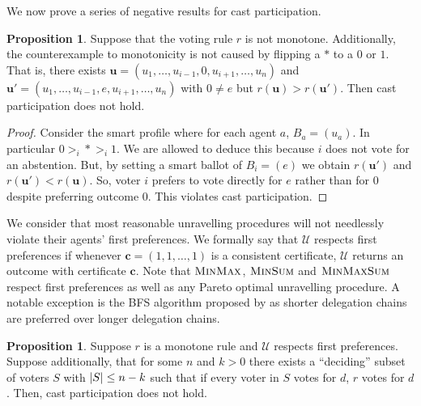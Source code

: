 \documentclass[11pt,a4paper, titlepage]{article}
\DeclarePairedDelimiter\abs{\lvert}{\rvert}
\theoremstyle{definition}
\newtheorem{proposition}[theorem]{Proposition}
\let\vec\mathbf
\begin{document}
We now prove a series of negative results for cast participation.



\begin{proposition} Suppose that the voting rule $r$ is not monotone. Additionally, the counterexample to monotonicity is not caused by flipping a $*$ to a $0$ or $1$. 
That is, there exists $\vec{u} = (u_1, \ldots, u_{i-1}, 0, u_{i+1}, \ldots, u_n)$ and $\vec{u}' = (u_1, \ldots, u_{i-1}, e, u_{i+1}, \ldots, u_n)$ with $0 \neq e$ but $r(\vec{u}) > r(\vec{u}')$. 
Then cast participation does not hold.
\end{proposition}

\begin{proof}
    Consider the smart profile where for each agent $a$, $B_a = (u_a)$. 
    In particular $0 >_i * >_i 1$. We are allowed to deduce this because $i$ does not vote for an abstention.
    But, by setting a smart ballot of $B_i = (e)$ we obtain $r(\vec{u}')$ and $ r(\vec{u}') < r(\vec{u})$. So, voter $i$ prefers to vote directly for $e$ rather than for $0$ despite preferring outcome $0$.
    This violates cast participation.
\end{proof}

We consider that most reasonable unravelling procedures will not needlessly violate their agents' first preferences. 
We formally say that $\mathcal{U}$ respects first preferences if whenever $\vec{c} = (1, 1, \ldots, 1)$ is a consistent certificate, $\mathcal{U}$ returns an outcome with certificate $\vec{c}$. 
Note that $\textsc{MinMax}$, $\textsc{MinSum}$ and $\textsc{MinMaxSum}$ respect first preferences as well as any Pareto optimal unravelling procedure. A notable exception is the BFS algorithm proposed by \citeauthor{kotsialou} as shorter delegation chains are preferred over longer delegation chains.

\begin{proposition}
    Suppose $r$ is a monotone rule and $\mathcal{U}$ respects first preferences. Suppose additionally, that for some $n$ and $k > 0$ there exists a ``deciding'' subset of voters $S$ with $\abs{S} \leq n - k$ such that if every voter in $S$ votes for $d$, $r$ votes for $d$.
    Then, cast participation does not hold.
\end{proposition}
\end{document}
